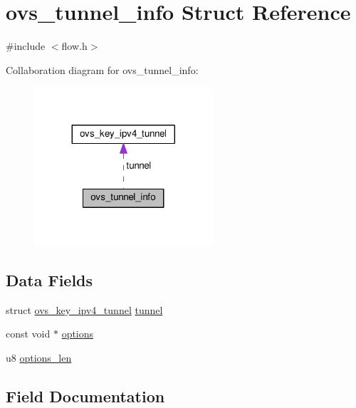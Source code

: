 \hypertarget{structovs__tunnel__info}{}\section{ovs\+\_\+tunnel\+\_\+info Struct Reference}
\label{structovs__tunnel__info}


{\ttfamily \#include $<$flow.\+h$>$}



Collaboration diagram for ovs\+\_\+tunnel\+\_\+info\+:
\nopagebreak
\begin{figure}[H]
\begin{center}
\leavevmode
\includegraphics[width=188pt]{structovs__tunnel__info__coll__graph}
\end{center}
\end{figure}
\subsection*{Data Fields}
\begin{DoxyCompactItemize}
\item 
struct \hyperlink{structovs__key__ipv4__tunnel}{ovs\+\_\+key\+\_\+ipv4\+\_\+tunnel} \hyperlink{structovs__tunnel__info_a007f0c7a9938884e6e8663cb4ab20d10}{tunnel}
\item 
const void $\ast$ \hyperlink{structovs__tunnel__info_ae4fd786894f579a38a5955e7a0e68fd4}{options}
\item 
u8 \hyperlink{structovs__tunnel__info_ab50d289f61727b922831739affb28b18}{options\+\_\+len}
\end{DoxyCompactItemize}


\subsection{Field Documentation}
\hypertarget{structovs__tunnel__info_ae4fd786894f579a38a5955e7a0e68fd4}{}
